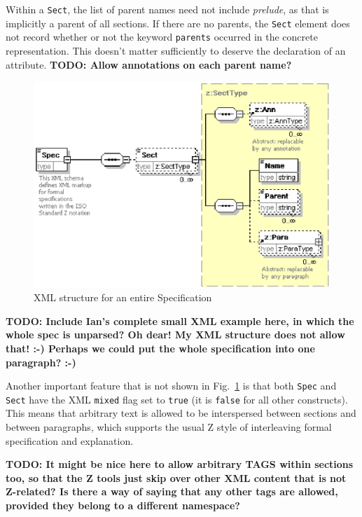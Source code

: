 \documentclass{llncs}  %
\newcommand{\AFont}[1]{\texttt{#1}}
\newcommand{\TODO}[1]{\textbf{TODO: #1}}   %
\begin{document}
Within a \AFont{Sect}, the list of parent names need not include
\textit{prelude}, as that is implicitly a parent of all sections.
If there are no parents,
the \AFont{Sect} element does not record whether or not
the keyword \AFont{parents} occurred in the concrete representation.
This doesn't matter sufficiently to deserve the declaration of an attribute.
\TODO{Allow annotations on each parent name?}

\begin{figure}[htbp]
  \centering
  \includegraphics[width=\textwidth]{spec.eps}
  \caption{XML structure for an entire Specification}
  \label{fig:spec}
\end{figure}

\TODO{Include Ian's complete small XML example here, in which
  the whole spec is unparsed?  Oh dear!  My XML structure does not
  allow that!  :-)  Perhaps we could put the whole specification into
  one paragraph?   :-)}

Another important feature that is not shown in Fig.~\ref{fig:spec} is that
both \AFont{Spec} and \AFont{Sect} have the XML \AFont{mixed} flag set to
\AFont{true} (it is \AFont{false} for all other constructs).  This means
that arbitrary text is allowed to be interspersed between sections and
between paragraphs, which supports the usual Z style of interleaving formal
specification and explanation.

\TODO{It might be nice here to allow arbitrary TAGS within sections too, so
  that the Z tools just skip over other XML content that is not Z-related?
  Is there a way of saying that any other tags are allowed,
  provided they belong to a different namespace?}
\end{document}

